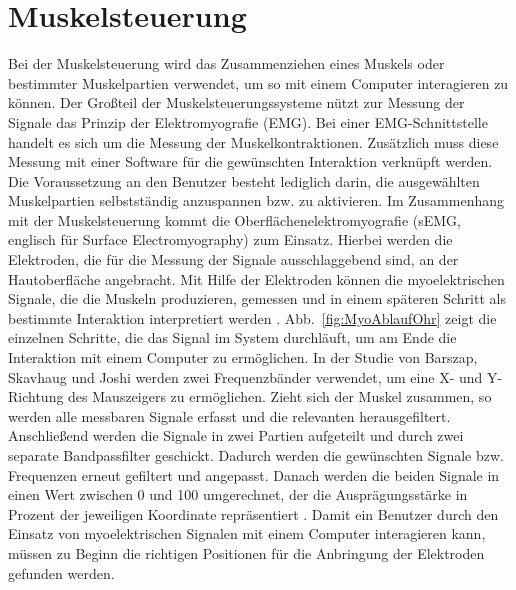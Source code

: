 \section{Muskelsteuerung}

Bei der Muskelsteuerung wird das Zusammenziehen eines Muskels oder bestimmter Muskelpartien verwendet, um so mit einem Computer interagieren zu können.
\newline \newline
Der Großteil der Muskelsteuerungssysteme nützt zur Messung der Signale das Prinzip der Elektromyografie (EMG). Bei einer EMG-Schnittstelle handelt es sich um die Messung der Muskelkontraktionen. Zusätzlich muss diese Messung mit einer Software für die gewünschten Interaktion verknüpft werden. Die Voraussetzung an den Benutzer besteht lediglich darin, die ausgewählten Muskelpartien selbstständig anzuspannen bzw. zu aktivieren. Im Zusammenhang mit der Muskelsteuerung kommt die Oberflächenelektromyografie (sEMG, englisch für Surface Electromyography) zum Einsatz. Hierbei werden die Elektroden, die für die Messung der Signale ausschlaggebend sind, an der Hautoberfläche angebracht. Mit Hilfe der Elektroden können die myoelektrischen Signale, die die Muskeln produzieren, gemessen und in einem späteren Schritt als bestimmte Interaktion interpretiert werden \cite{EmgDefinition}.
\newline \newline
Abb.~\ref{fig:MyoAblaufOhr} zeigt die einzelnen Schritte, die das Signal im System durchläuft, um am Ende die Interaktion mit einem Computer zu ermöglichen. In der Studie von Barszap, Skavhaug und Joshi \cite{MyoOhr} werden zwei Frequenzbänder verwendet, um eine X- und Y- Richtung des Mauszeigers zu ermöglichen. Zieht sich der Muskel zusammen, so werden alle messbaren Signale erfasst und die relevanten herausgefiltert. Anschließend werden die Signale in zwei Partien aufgeteilt und durch zwei separate Bandpassfilter geschickt. \newline
Dadurch werden die gewünschten Signale bzw. Frequenzen erneut gefiltert und angepasst. Danach werden die beiden Signale in einen Wert zwischen 0 und 100 umgerechnet, der die Ausprägungsstärke in Prozent der jeweiligen Koordinate repräsentiert \cite{MyoOhr}.
\newline \newline
Damit ein Benutzer durch den Einsatz von myoelektrischen Signalen mit einem Computer interagieren kann, müssen zu Beginn die richtigen Positionen für die Anbringung der Elektroden gefunden werden.  

